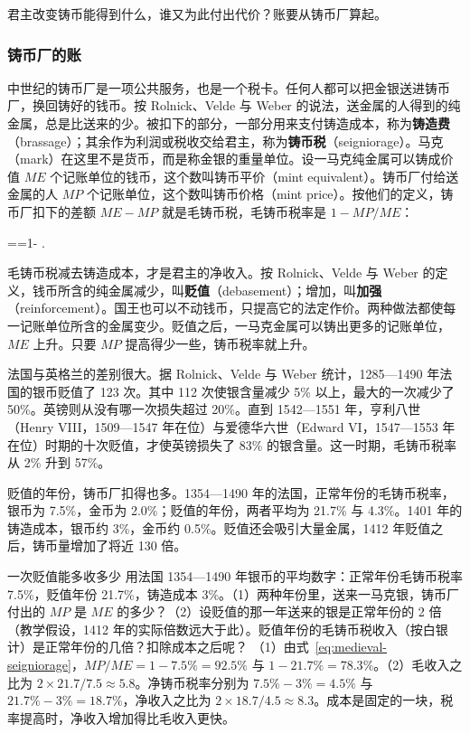 君主改变铸币能得到什么，谁又为此付出代价？账要从铸币厂算起。

\subsubsection{铸币厂的账}
中世纪的铸币厂是一项公共服务，也是一个税卡。任何人都可以把金银送进铸币厂，换回铸好的钱币。按 Rolnick、Velde 与 Weber 的说法，送金属的人得到的纯金属，总是比送来的少。被扣下的部分，一部分用来支付铸造成本，称为\textbf{铸造费}（brassage）；其余作为利润或税收交给君主，称为\textbf{铸币税}（seigniorage）\cite{rvw1996}。马克（mark）在这里不是货币，而是称金银的重量单位。设一马克纯金属可以铸成价值 $ME$ 个记账单位的钱币，这个数叫铸币平价（mint equivalent）。铸币厂付给送金属的人 $MP$ 个记账单位，这个数叫铸币价格（mint price）。按他们的定义，铸币厂扣下的差额 $ME-MP$ 就是毛铸币税，毛铸币税率是 $1-MP/ME$：
\begin{keyeq}
==1- .\label{eq:medieval-seigniorage}
\end{keyeq}
毛铸币税减去铸造成本，才是君主的净收入。按 Rolnick、Velde 与 Weber 的定义，钱币所含的纯金属减少，叫\textbf{贬值}（debasement）；增加，叫\textbf{加强}（reinforcement）\cite{rvw1996}。国王也可以不动钱币，只提高它的法定作价。两种做法都使每一记账单位所含的金属变少。贬值之后，一马克金属可以铸出更多的记账单位，$ME$ 上升。只要 $MP$ 提高得少一些，铸币税率就上升。

法国与英格兰的差别很大。据 Rolnick、Velde 与 Weber 统计，1285—1490 年法国的银币贬值了 123 次。其中 112 次使银含量减少 5\% 以上，最大的一次减少了 50\%。英镑则从没有哪一次损失超过 20\%。直到 1542—1551 年，亨利八世（Henry VIII，1509—1547 年在位）与爱德华六世（Edward VI，1547—1553 年在位）时期的十次贬值，才使英镑损失了 83\% 的银含量。这一时期，毛铸币税率从 2\% 升到 57\%\cite{rvw1996}。

贬值的年份，铸币厂扣得也多。1354—1490 年的法国，正常年份的毛铸币税率，银币为 7.5\%，金币为 2.0\%；贬值的年份，两者平均为 21.7\% 与 4.3\%。1401 年的铸造成本，银币约 3\%，金币约 0.5\%。贬值还会吸引大量金属，1412 年贬值之后，铸币量增加了将近 130 倍\cite{rvw1996}。

\begin{example}{一次贬值能多收多少}\label{ex:medieval-seigniorage}
用法国 1354—1490 年银币的平均数字：正常年份毛铸币税率 7.5\%，贬值年份 21.7\%，铸造成本 3\%。（1）两种年份里，送来一马克银，铸币厂付出的 $MP$ 是 $ME$ 的多少？（2）设贬值的那一年送来的银是正常年份的 2 倍（教学假设，1412 年的实际倍数远大于此）。贬值年份的毛铸币税收入（按白银计）是正常年份的几倍？扣除成本之后呢？
\solution （1）由式~\eqref{eq:medieval-seigniorage}，$MP/ME=1-7.5\%=92.5\%$ 与 $1-21.7\%=78.3\%$。（2）毛收入之比为 $2\times21.7/7.5\approx5.8$。净铸币税率分别为 $7.5\%-3\%=4.5\%$ 与 $21.7\%-3\%=18.7\%$，净收入之比为 $2\times18.7/4.5\approx8.3$。成本是固定的一块，税率提高时，净收入增加得比毛收入更快。
\end{example}

